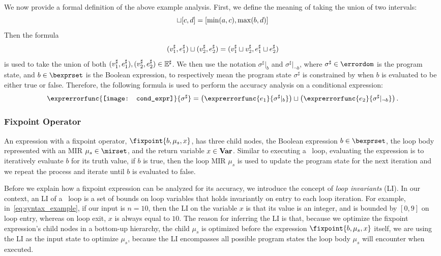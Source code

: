 We now provide a formal definition of the above example analysis.  First, we
define the meaning of taking the union of two intervals:
\begin{equation}
    [a, b] \join [c, d] = [\min(a, c), \max(b, d)]
\end{equation}
Then the formula
\begin{equation}
    (v^\sharp_1, e^\sharp_1) \sqcup (v^\sharp_2, e^\sharp_2) =
    (v^\sharp_1 \sqcup v^\sharp_2, e^\sharp_1 \sqcup e^\sharp_2) 
\end{equation}
is used to take the union of both $(v^\sharp_1, e^\sharp_1), (v^\sharp_2,
e^\sharp_2) \in \mathbb{E}^\sharp$.  We then use the notation $\sigma^\sharp|_b$ and
$\sigma^\sharp|_{\neg b}$, where $\sigma^\sharp \in \errordom$ is the program
state, and $b \in \bexprset$ is the Boolean expression, to respectively mean
the program state $\sigma^\sharp$ is constrained by when $b$ is evaluated to be
either true or false.  Therefore, the following formula is used to perform the
accuracy analysis on a conditional expression:
\begin{equation}
    \exprerrorfunc{%
        \begin{aligned}
            \texttt{[image: cond\_expr]}
            \vspace{-5pt}
        \end{aligned}
    }{\sigma^\sharp}
    =
    \left(\exprerrorfunc{e_1}{\sigma^\sharp|_b}\right) \join
    \left(\exprerrorfunc{e_2}{\sigma^\sharp|_{\neg b}}\right).
\end{equation}

\subsubsection{Fixpoint Operator}

An expression with a fixpoint operator, $\fixpoint{b, \mu_s, x}$, has
three child nodes, the Boolean expression $b \in \bexprset$, the loop body
represented with an MIR $\mu_s \in \mirset$, and the return variable $x \in
\mathbf{Var}$.  Similar to executing a \whilelit~loop, evaluating the expression is
to iteratively evaluate $b$ for its truth value, if $b$ is true, then the loop
MIR $\mu_s$ is used to update the program state for the next iteration and we
repeat the process and iterate until $b$ is evaluated to false.

Before we explain how a fixpoint expression can be analyzed for its accuracy,
we introduce the concept of \emph{loop invariants} (LI).  In our context, an LI
of a \whilelit~loop is a set of bounds on loop variables that holds invariantly
on entry to each loop iteration.  For example, in~\eqref{eq:syntax_example},
if our input is $n = 10$, then the LI on the variable $x$ is that its value is
an integer, and is bounded by $[0, 9]$ on loop entry, whereas on loop exit,
$x$ is always equal to $10$.  The reason for inferring the LI is that, because
we optimize the fixpoint expression's child nodes in a bottom-up hierarchy,
the child $\mu_s$ is optimized before the expression $\fixpoint{b, \mu_s, x}$
itself, we are using the LI as the input state to optimize $\mu_s$, because the
LI encompasses all possible program states the loop body $\mu_s$ will encounter
when executed.


